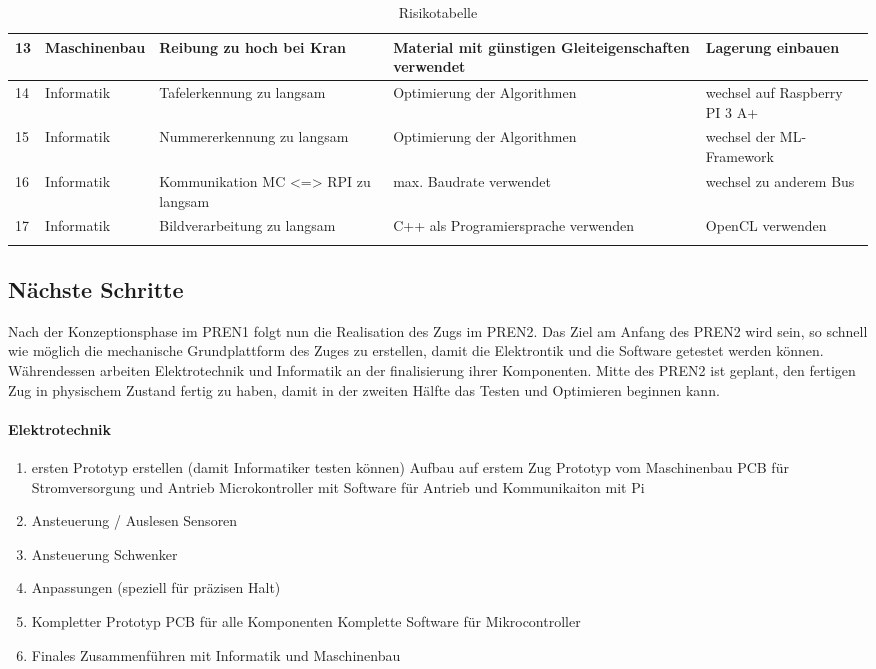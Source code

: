 \documentclass[../../main.tex]{subfiles}
\begin{document}
\begin{longtable}{|l|p{2.5cm}|p{3cm}|p{3.8cm}|p{3.8cm}|}
    13  & Maschinenbau & Reibung zu hoch bei Kran                                   & Material mit günstigen Gleiteigenschaften verwendet & Lagerung einbauen \\ \hline
    14 & Informatik    & Tafelerkennung zu langsam                              & Optimierung der Algorithmen   & wechsel auf Raspberry PI 3 A+ \\ \hline
    15 & Informatik     & Nummererkennung zu langsam                            & Optimierung der Algorithmen   & wechsel der ML- Framework \\ \hline
    16 & Informatik     & Kommunikation MC <=> RPI zu langsam                   & max. Baudrate verwendet       & wechsel zu anderem Bus \\ \hline
    17 & Informatik     & Bildverarbeitung zu langsam                           & C++ als Programiersprache verwenden & OpenCL verwenden \\ \hline
    \caption{Risikotabelle}
    \end{longtable}


\subsection{Nächste Schritte}
Nach der Konzeptionsphase im PREN1 folgt nun die Realisation des Zugs im PREN2. Das Ziel am Anfang des PREN2 wird sein, so schnell wie möglich die mechanische Grundplattform des Zuges zu erstellen, damit die Elektrontik und die Software getestet werden können. Währendessen arbeiten Elektrotechnik und Informatik an der finalisierung ihrer Komponenten. Mitte des PREN2 ist geplant, den fertigen Zug in physischem Zustand fertig zu haben, damit in der zweiten Hälfte das Testen und Optimieren beginnen kann.
\paragraph{Elektrotechnik}
\begin{enumerate}
    \item ersten Prototyp erstellen (damit Informatiker testen können)
        \subitem Aufbau auf erstem Zug Prototyp vom Maschinenbau
        \subitem PCB für Stromversorgung und Antrieb
        \subitem Microkontroller mit Software für Antrieb und Kommunikaiton mit Pi
    \item Ansteuerung / Auslesen Sensoren
    \item Ansteuerung Schwenker
    \item Anpassungen (speziell für präzisen Halt)
    \item Kompletter Prototyp
        \subitem PCB für alle Komponenten
        \subitem Komplette Software für Mikrocontroller
    \item Finales Zusammenführen mit Informatik und Maschinenbau
\end{enumerate}
\end{document}
